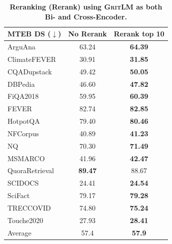 \documentclass{article}
\newcommand{\model}{\textsc{GritLM}}
\begin{document}
\begin{table}
\caption{\textbf{Reranking (Rerank) using \model{} as both Bi- and Cross-Encoder.}}
\begin{tabular}{l|cc}
\toprule
MTEB DS ($\downarrow$) & No Rerank & Rerank top 10 \\
\midrule
ArguAna & 63.24 & \textbf{64.39} \\
ClimateFEVER & 30.91 & \textbf{31.85} \\
CQADupstack & 49.42 & \textbf{50.05} \\
DBPedia & 46.60 & \textbf{47.82} \\
FiQA2018 & 59.95 & \textbf{60.39} \\
FEVER & 82.74 & \textbf{82.85} \\
HotpotQA & 79.40 & \textbf{80.46} \\
NFCorpus & 40.89 & \textbf{41.23} \\
NQ & 70.30 & \textbf{71.49} \\
MSMARCO & 41.96 & \textbf{42.47} \\
QuoraRetrieval & \textbf{89.47} & 88.67 \\
SCIDOCS & 24.41 & \textbf{24.54} \\
SciFact & 79.17 & \textbf{79.28} \\
TRECCOVID & 74.80 & \textbf{75.24} \\
Touche2020 & 27.93 & \textbf{28.41} \\
\midrule
Average & 57.4 & \textbf{57.9} \\
\bottomrule
\end{tabular}
\label{tab:rr}
\end{table}
\end{document}
